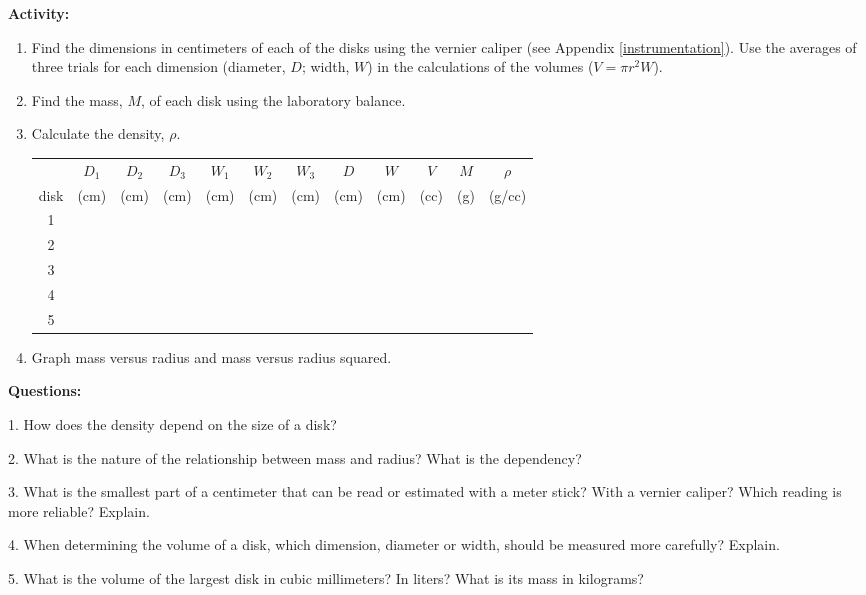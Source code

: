 {\noindent \bf Activity:} \begin{enumerate}

\item Find the dimensions in centimeters of each of the disks using the vernier caliper (see Appendix \ref{instrumentation}). Use the averages of three trials for each dimension (diameter, $D$; width, $W$) in the calculations of the volumes ($V = \pi r^2 W$).

\item Find the mass, $M$, of each disk using the laboratory balance.

\item Calculate the density, $\rho$.

\begin{center} \begin{tabular}{|c|c|c|c|c|c|c|c|c|c|c|c|} \hline \multicolumn{1}{|c||}{} & $D_1$ & $D_2$ & $D_3$ & $W_1$ & $W_2$ & $W_3$ & $D$ & $W$ & $V$ & $M$ & $\rho$\\ \multicolumn{1}{|c||}{disk} & (cm) & (cm) & (cm) & (cm) & (cm) & (cm) & (cm) & (cm) & (cc) & (g) & (g/cc) \\ \hline \hline \multicolumn{1}{|c||}{1} & & & & & & & & & & & \\ \hline \multicolumn{1}{|c||}{2} & & & & & & & & & & & \\ \hline \multicolumn{1}{|c||}{3} & & & & & & & & & & & \\ \hline \multicolumn{1}{|c||}{4} & & & & & & & & & & & \\ \hline \multicolumn{1}{|c||}{5} & & & & & & & & & & & \\ \hline \end{tabular} \end{center}

\item Graph mass versus radius and mass versus radius squared.

\end{enumerate}

\pagebreak

{\noindent \bf Questions:}

1. How does the density depend on the size of a disk? 
\vspace{20mm}

2. What is the nature of the relationship between mass and radius? What is the
dependency? 
\vspace{20mm}

3. What is the smallest part of a centimeter that can be read or estimated with
a meter stick? With a vernier caliper? Which reading is more reliable? Explain.
\vspace{20mm}

4. When determining the volume of a disk, which dimension, diameter or width,
should be measured more carefully? Explain. 
\vspace{20mm}

5. What is the volume of the largest disk in cubic millimeters? In liters? What
is its mass in kilograms?

